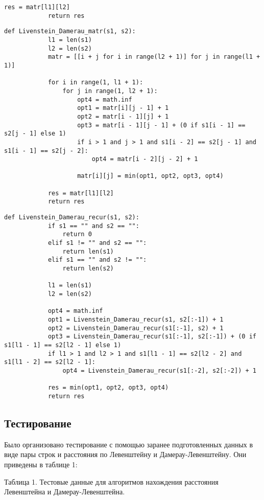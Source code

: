 \documentclass[a4paper, 14pt]{article}
\begin{document}
\begin{center}
\begin{flushleft}
\begin{flushleft}
\begin{lstlisting}[label=some-code,caption=Функция нахождения расстояния Левенштейна итеративно]
	    	res = matr[l1][l2]
    		return res
        \end{lstlisting}
        \newpage
        \begin{lstlisting}[label=some-code,caption=Функция нахождения расстояния Дамерау-Левенштейна итеративно]
		def Livenstein_Damerau_matr(s1, s2):
			l1 = len(s1)
			l2 = len(s2)
			matr = [[i + j for i in range(l2 + 1)] for j in range(l1 + 1)]
			
			for i in range(1, l1 + 1):
				for j in range(1, l2 + 1):
				    opt4 = math.inf
				    opt1 = matr[i][j - 1] + 1
				    opt2 = matr[i - 1][j] + 1
				    opt3 = matr[i - 1][j - 1] + (0 if s1[i - 1] == s2[j - 1] else 1)
				    if i > 1 and j > 1 and s1[i - 2] == s2[j - 1] and s1[i - 1] == s2[j - 2]:
				        opt4 = matr[i - 2][j - 2] + 1
				    
				    matr[i][j] = min(opt1, opt2, opt3, opt4)
				    
			res = matr[l1][l2]
			return res
        \end{lstlisting}
        \begin{lstlisting}[label=some-code,caption=Функция нахождения расстояния Дамерау-Левенштейна рекурсивно]
	def Livenstein_Damerau_recur(s1, s2):
			if s1 == "" and s2 == "":
				return 0
			elif s1 != "" and s2 == "":
				return len(s1)
			elif s1 == "" and s2 != "":
				return len(s2)
				
			l1 = len(s1)
			l2 = len(s2)

			opt4 = math.inf
			opt1 = Livenstein_Damerau_recur(s1, s2[:-1]) + 1
			opt2 = Livenstein_Damerau_recur(s1[:-1], s2) + 1
			opt3 = Livenstein_Damerau_recur(s1[:-1], s2[:-1]) + (0 if s1[l1 - 1] == s2[l2 - 1] else 1)    
			if l1 > 1 and l2 > 1 and s1[l1 - 1] == s2[l2 - 2] and s1[l1 - 2] == s2[l2 - 1]:
				opt4 = Livenstein_Damerau_recur(s1[:-2], s2[:-2]) + 1
				
			res = min(opt1, opt2, opt3, opt4)
			return res
        \end{lstlisting}
		\end{flushleft}
        
		\newpage
		
        \subsection{Тестирование}
        \begin{flushleft}
        \parindent=1cm
        Было организовано тестирование с помощью заранее подготовленных данных в виде пары строк и расстояния по Левенштейну и Дамерау-Левенштейну. Они приведены в таблице 1:\\
        	\begin{center}
  	Таблица 1. Тестовые данные для алгоритмов нахождения расстояния Левенштейна и Дамерау-Левенштейна.\\
	\end{center}
        

\end{flushleft}
\end{flushleft}
\end{center}
\end{document}
